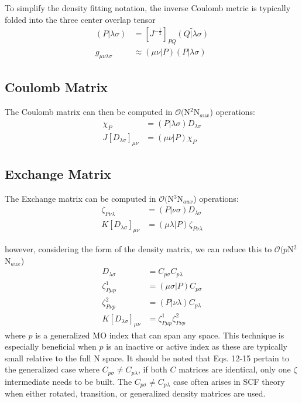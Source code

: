 \documentclass[aip,jcp,preprint,superscriptaddress,floatfix]{revtex4-1}
\begin{document}
To simplify the density fitting notation, the inverse Coulomb metric is typically folded into the three center overlap tensor
\begin{align}
(P| \lambda \sigma) &= [J^{-\frac{1}{2}}]_{PQ} \widetilde{(Q| \lambda \sigma)}\\
g_{\mu \nu \lambda \sigma} &\approx (\mu \nu |P) (P| \lambda \sigma)
\end{align}

\subsection{Coulomb Matrix}
The Coulomb matrix can then be computed in $\mathcal{O}($N$^2$N$_{aux}$) operations:
\begin{align}
\chi_P &= (P| \lambda \sigma) D_{ \lambda \sigma} \\
J[D_{ \lambda \sigma}]_{\mu \nu} &= (\mu \nu |P) \chi_P
\end{align}

\subsection{Exchange Matrix}
The Exchange matrix can be computed in $\mathcal{O}($N$^3$N$_{aux}$) operations:
\begin{align}
\zeta_{P \nu\lambda} &= (P| \nu \sigma) D_{ \lambda \sigma} \\
K[D_{ \lambda \sigma}]_{\mu \nu} &= (\mu \lambda |P) \zeta_{P\nu\lambda} 
\end{align}

however, considering the form of the density matrix, we can reduce this to $\mathcal{O}(p$N$^2$N$_{aux}$)
\begin{align}
D_{\lambda \sigma} &= C_{p\sigma}C_{p\lambda}\\
\zeta^1_{P \mu p} &= (\mu \sigma | P) C_{ p \sigma} \\
\zeta^2_{P \nu p} &= (P| \nu \lambda) C_{ p \lambda} \\
K[D_{ \lambda \sigma}]_{\mu \nu} &= \zeta^1_{P \mu p} \zeta^2_{P \nu p}
\end{align}
where $p$ is a generalized MO index that can span any space.
This technique is especially beneficial when $p$ is an inactive or active index as these are typically small relative to the full N space.
It should be noted that Eqs. 12-15 pertain to the generalized case where $C_{p\sigma} \neq C_{p\lambda}$, if both $C$ matrices are identical, only one $\zeta$ intermediate needs to be built.
The $C_{p\sigma} \neq C_{p\lambda}$ case often arises in SCF theory when either rotated, transition, or generalized density matrices are used.
\end{document}
